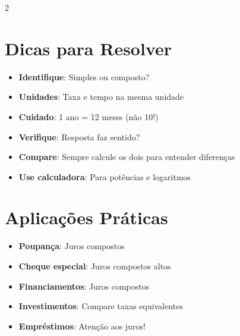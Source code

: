 \documentclass[11pt]{article}
\begin{document}
\begin{multicols}{2}
\section*{Dicas para Resolver}

\begin{itemize}
\item \textbf{Identifique}: Simples ou composto?
\item \textbf{Unidades}: Taxa e tempo na mesma unidade
\item \textbf{Cuidado}: 1 ano = 12 meses (não 10!)
\item \textbf{Verifique}: Resposta faz sentido?
\item \textbf{Compare}: Sempre calcule os dois para entender diferenças
\item \textbf{Use calculadora}: Para potências e logaritmos
\end{itemize}

\section*{Aplicações Práticas}

\begin{itemize}
\item \textbf{Poupança}: Juros compostos
\item \textbf{Cheque especial}: Juros compostos altos
\item \textbf{Financiamentos}: Juros compostos
\item \textbf{Investimentos}: Compare taxas equivalentes
\item \textbf{Empréstimos}: Atenção aos juros!
\end{itemize}

\end{multicols}
\end{document}
